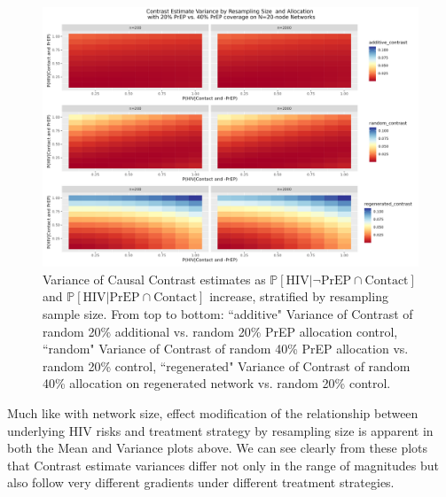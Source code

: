 \documentclass{article}
\theoremstyle{definition}
\begin{document}
\begin{figure}[H]
    \centering
    \includegraphics[width=\linewidth]{Corrected Figures/Resampling Size Variance Plot.png}
    \caption{Variance of Causal Contrast estimates as $\mathbb{P}\left[\text{HIV} \vert \neg \text{PrEP} \cap \text{Contact}\right]$ and $\mathbb{P}\left[\text{HIV} \vert \text{PrEP} \cap \text{Contact}\right]$ increase, stratified by resampling sample size. From top to bottom: ``additive" Variance of Contrast of random 20\% additional vs. random 20\% PrEP allocation control, ``random" Variance of Contrast of random 40\% PrEP allocation vs. random 20\% control, ``regenerated" Variance of Contrast of random 40\% allocation on regenerated network vs. random 20\% control.}
    \label{ffig:Figure S4.4}
\end{figure}
Much like with network size, effect modification of the relationship between underlying HIV risks and treatment strategy by resampling size is apparent in both the Mean and Variance plots above. We can see clearly from these plots that Contrast estimate variances differ not only in the range of magnitudes but also follow very different gradients under different treatment strategies.
\end{document}
